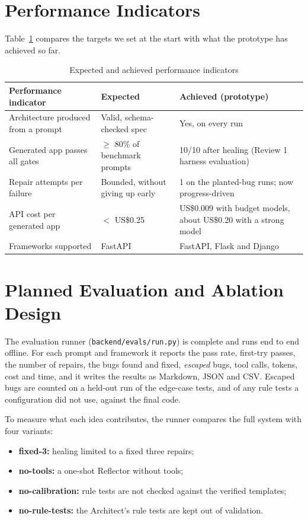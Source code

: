 \documentclass[12pt,a4paper]{report}
\begin{document}
\section{Performance Indicators}

Table~\ref{tab:kpi} compares the targets we set at the start with what the prototype has achieved so far.

\begin{table}[!ht]
    \centering
    \renewcommand{\arraystretch}{1.3}
    \caption{Expected and achieved performance indicators}
    \label{tab:kpi}
    \begin{tabular}{|p{5cm}|p{3.8cm}|p{4.8cm}|}
    \hline
    \textbf{Performance indicator} & \textbf{Expected} & \textbf{Achieved (prototype)} \\\hline
    Architecture produced from a prompt & Valid, schema-checked spec & Yes, on every run \\\hline
    Generated app passes all gates & $\geq$ 80\% of benchmark prompts & 10/10 after healing (Review 1 harness evaluation) \\\hline
    Repair attempts per failure & Bounded, without giving up early & 1 on the planted-bug runs; now progress-driven \\\hline
    API cost per generated app & $<$ US\$0.25 & US\$0.009 with budget models, about US\$0.20 with a strong model \\\hline
    Frameworks supported & FastAPI & FastAPI, Flask and Django \\\hline
    \end{tabular}
\end{table}

\section{Planned Evaluation and Ablation Design}

The evaluation runner (\texttt{backend/evals/run.py}) is complete and runs end to end offline. For each prompt and framework it reports the pass rate, first-try passes, the number of repairs, the bugs found and fixed, \emph{escaped} bugs, tool calls, tokens, cost and time, and it writes the results as Markdown, JSON and CSV. Escaped bugs are counted on a held-out run of the edge-case tests, and of any rule tests a configuration did not use, against the final code.

To measure what each idea contributes, the runner compares the full system with four variants:
\begin{itemize}
    \item \textbf{fixed-3:} healing limited to a fixed three repairs;
    \item \textbf{no-tools:} a one-shot Reflector without tools;
    \item \textbf{no-calibration:} rule tests are not checked against the verified templates;
    \item \textbf{no-rule-tests:} the Architect's rule tests are kept out of validation.
\end{itemize}
\end{document}
